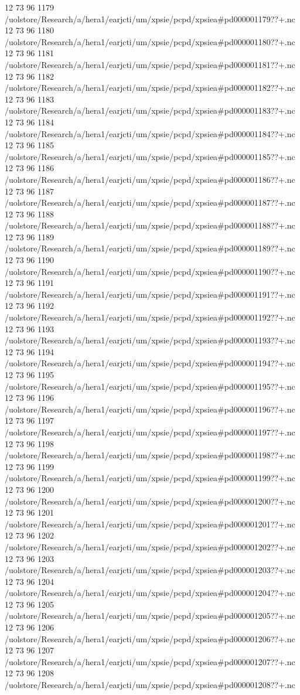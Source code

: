 12 73 96
1179
/uolstore/Research/a/hera1/earjcti/um/xpsie/pcpd/xpsiea#pd000001179??+.nc
12 73 96
1180
/uolstore/Research/a/hera1/earjcti/um/xpsie/pcpd/xpsiea#pd000001180??+.nc
12 73 96
1181
/uolstore/Research/a/hera1/earjcti/um/xpsie/pcpd/xpsiea#pd000001181??+.nc
12 73 96
1182
/uolstore/Research/a/hera1/earjcti/um/xpsie/pcpd/xpsiea#pd000001182??+.nc
12 73 96
1183
/uolstore/Research/a/hera1/earjcti/um/xpsie/pcpd/xpsiea#pd000001183??+.nc
12 73 96
1184
/uolstore/Research/a/hera1/earjcti/um/xpsie/pcpd/xpsiea#pd000001184??+.nc
12 73 96
1185
/uolstore/Research/a/hera1/earjcti/um/xpsie/pcpd/xpsiea#pd000001185??+.nc
12 73 96
1186
/uolstore/Research/a/hera1/earjcti/um/xpsie/pcpd/xpsiea#pd000001186??+.nc
12 73 96
1187
/uolstore/Research/a/hera1/earjcti/um/xpsie/pcpd/xpsiea#pd000001187??+.nc
12 73 96
1188
/uolstore/Research/a/hera1/earjcti/um/xpsie/pcpd/xpsiea#pd000001188??+.nc
12 73 96
1189
/uolstore/Research/a/hera1/earjcti/um/xpsie/pcpd/xpsiea#pd000001189??+.nc
12 73 96
1190
/uolstore/Research/a/hera1/earjcti/um/xpsie/pcpd/xpsiea#pd000001190??+.nc
12 73 96
1191
/uolstore/Research/a/hera1/earjcti/um/xpsie/pcpd/xpsiea#pd000001191??+.nc
12 73 96
1192
/uolstore/Research/a/hera1/earjcti/um/xpsie/pcpd/xpsiea#pd000001192??+.nc
12 73 96
1193
/uolstore/Research/a/hera1/earjcti/um/xpsie/pcpd/xpsiea#pd000001193??+.nc
12 73 96
1194
/uolstore/Research/a/hera1/earjcti/um/xpsie/pcpd/xpsiea#pd000001194??+.nc
12 73 96
1195
/uolstore/Research/a/hera1/earjcti/um/xpsie/pcpd/xpsiea#pd000001195??+.nc
12 73 96
1196
/uolstore/Research/a/hera1/earjcti/um/xpsie/pcpd/xpsiea#pd000001196??+.nc
12 73 96
1197
/uolstore/Research/a/hera1/earjcti/um/xpsie/pcpd/xpsiea#pd000001197??+.nc
12 73 96
1198
/uolstore/Research/a/hera1/earjcti/um/xpsie/pcpd/xpsiea#pd000001198??+.nc
12 73 96
1199
/uolstore/Research/a/hera1/earjcti/um/xpsie/pcpd/xpsiea#pd000001199??+.nc
12 73 96
1200
/uolstore/Research/a/hera1/earjcti/um/xpsie/pcpd/xpsiea#pd000001200??+.nc
12 73 96
1201
/uolstore/Research/a/hera1/earjcti/um/xpsie/pcpd/xpsiea#pd000001201??+.nc
12 73 96
1202
/uolstore/Research/a/hera1/earjcti/um/xpsie/pcpd/xpsiea#pd000001202??+.nc
12 73 96
1203
/uolstore/Research/a/hera1/earjcti/um/xpsie/pcpd/xpsiea#pd000001203??+.nc
12 73 96
1204
/uolstore/Research/a/hera1/earjcti/um/xpsie/pcpd/xpsiea#pd000001204??+.nc
12 73 96
1205
/uolstore/Research/a/hera1/earjcti/um/xpsie/pcpd/xpsiea#pd000001205??+.nc
12 73 96
1206
/uolstore/Research/a/hera1/earjcti/um/xpsie/pcpd/xpsiea#pd000001206??+.nc
12 73 96
1207
/uolstore/Research/a/hera1/earjcti/um/xpsie/pcpd/xpsiea#pd000001207??+.nc
12 73 96
1208
/uolstore/Research/a/hera1/earjcti/um/xpsie/pcpd/xpsiea#pd000001208??+.nc
